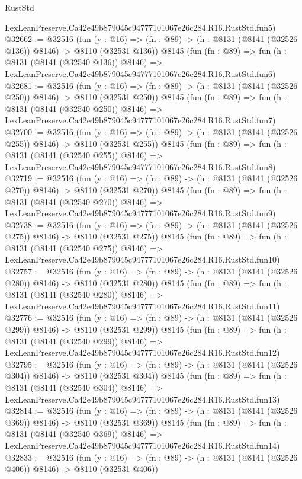 \begin{lexlean}{RustStd}
\begin{coremodule}
    LexLeanPreserve.Ca42e49b879045c94777101067e26c284.R16.RustStd.fun5)
@32662 := @32516
    (fun (y : @16) => (fn : @89) -> (h : @8131 (@8141 (@32526 @136)) @8146) -> @8110 (@32531 @136))
    @8145
    (fun (fn : @89) =>
    fun (h : @8131 (@8141 (@32540 @136)) @8146) =>
    LexLeanPreserve.Ca42e49b879045c94777101067e26c284.R16.RustStd.fun6)
@32681 := @32516
    (fun (y : @16) => (fn : @89) -> (h : @8131 (@8141 (@32526 @250)) @8146) -> @8110 (@32531 @250))
    @8145
    (fun (fn : @89) =>
    fun (h : @8131 (@8141 (@32540 @250)) @8146) =>
    LexLeanPreserve.Ca42e49b879045c94777101067e26c284.R16.RustStd.fun7)
@32700 := @32516
    (fun (y : @16) => (fn : @89) -> (h : @8131 (@8141 (@32526 @255)) @8146) -> @8110 (@32531 @255))
    @8145
    (fun (fn : @89) =>
    fun (h : @8131 (@8141 (@32540 @255)) @8146) =>
    LexLeanPreserve.Ca42e49b879045c94777101067e26c284.R16.RustStd.fun8)
@32719 := @32516
    (fun (y : @16) => (fn : @89) -> (h : @8131 (@8141 (@32526 @270)) @8146) -> @8110 (@32531 @270))
    @8145
    (fun (fn : @89) =>
    fun (h : @8131 (@8141 (@32540 @270)) @8146) =>
    LexLeanPreserve.Ca42e49b879045c94777101067e26c284.R16.RustStd.fun9)
@32738 := @32516
    (fun (y : @16) => (fn : @89) -> (h : @8131 (@8141 (@32526 @275)) @8146) -> @8110 (@32531 @275))
    @8145
    (fun (fn : @89) =>
    fun (h : @8131 (@8141 (@32540 @275)) @8146) =>
    LexLeanPreserve.Ca42e49b879045c94777101067e26c284.R16.RustStd.fun10)
@32757 := @32516
    (fun (y : @16) => (fn : @89) -> (h : @8131 (@8141 (@32526 @280)) @8146) -> @8110 (@32531 @280))
    @8145
    (fun (fn : @89) =>
    fun (h : @8131 (@8141 (@32540 @280)) @8146) =>
    LexLeanPreserve.Ca42e49b879045c94777101067e26c284.R16.RustStd.fun11)
@32776 := @32516
    (fun (y : @16) => (fn : @89) -> (h : @8131 (@8141 (@32526 @299)) @8146) -> @8110 (@32531 @299))
    @8145
    (fun (fn : @89) =>
    fun (h : @8131 (@8141 (@32540 @299)) @8146) =>
    LexLeanPreserve.Ca42e49b879045c94777101067e26c284.R16.RustStd.fun12)
@32795 := @32516
    (fun (y : @16) => (fn : @89) -> (h : @8131 (@8141 (@32526 @304)) @8146) -> @8110 (@32531 @304))
    @8145
    (fun (fn : @89) =>
    fun (h : @8131 (@8141 (@32540 @304)) @8146) =>
    LexLeanPreserve.Ca42e49b879045c94777101067e26c284.R16.RustStd.fun13)
@32814 := @32516
    (fun (y : @16) => (fn : @89) -> (h : @8131 (@8141 (@32526 @369)) @8146) -> @8110 (@32531 @369))
    @8145
    (fun (fn : @89) =>
    fun (h : @8131 (@8141 (@32540 @369)) @8146) =>
    LexLeanPreserve.Ca42e49b879045c94777101067e26c284.R16.RustStd.fun14)
@32833 := @32516
    (fun (y : @16) => (fn : @89) -> (h : @8131 (@8141 (@32526 @406)) @8146) -> @8110 (@32531 @406))

\end{coremodule}
\end{lexlean}

